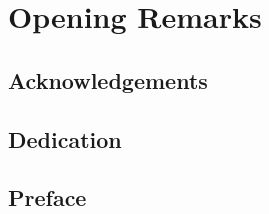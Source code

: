 
\section{Opening Remarks}
    \subsection{Acknowledgements}
        
    \subsection{Dedication}
        
    \subsection{Preface}
